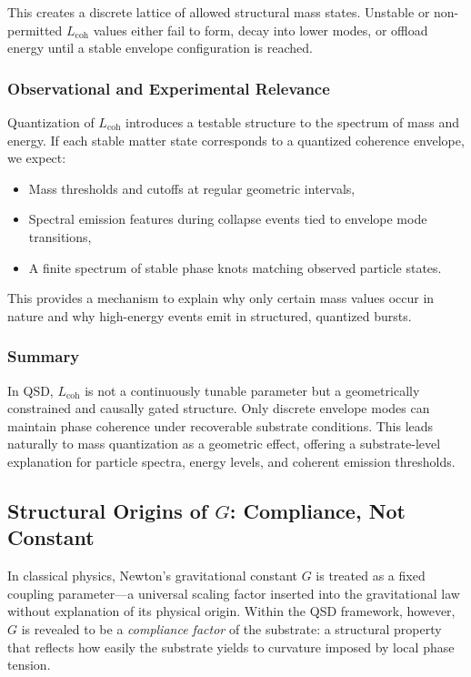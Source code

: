\documentclass[entropy,article,submit,pdftex,moreauthors]{Definitions/mdpi}
\begin{document}
This creates a discrete lattice of allowed structural mass states. Unstable or non-permitted $L_{\text{coh}}$ values either fail to form, decay into lower modes, or offload energy until a stable envelope configuration is reached.

\subsubsection{Observational and Experimental Relevance}

Quantization of $L_{\text{coh}}$ introduces a testable structure to the spectrum of mass and energy. If each stable matter state corresponds to a quantized coherence envelope, we expect:
\begin{itemize}
  \item Mass thresholds and cutoffs at regular geometric intervals,
  \item Spectral emission features during collapse events tied to envelope mode transitions,
  \item A finite spectrum of stable phase knots matching observed particle states.
\end{itemize}

This provides a mechanism to explain why only certain mass values occur in nature and why high-energy events emit in structured, quantized bursts.

\subsubsection{Summary}

In QSD, $L_{\text{coh}}$ is not a continuously tunable parameter but a geometrically constrained and causally gated structure. Only discrete envelope modes can maintain phase coherence under recoverable substrate conditions. This leads naturally to mass quantization as a geometric effect, offering a substrate-level explanation for particle spectra, energy levels, and coherent emission thresholds.

\subsection{Structural Origins of \texorpdfstring{$G$}{G}: Compliance, Not Constant}

In classical physics, Newton’s gravitational constant $G$ is treated as a fixed coupling parameter—a universal scaling factor inserted into the gravitational law without explanation of its physical origin. Within the QSD framework, however, $G$ is revealed to be a \textit{compliance factor} of the substrate: a structural property that reflects how easily the substrate yields to curvature imposed by local phase tension.
\end{document}

